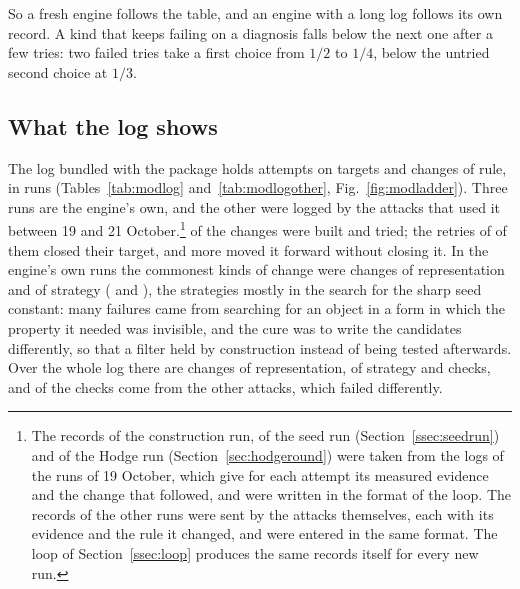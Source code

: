 So a fresh engine follows the table, and an engine with a long log follows its own record. A kind that keeps failing on a diagnosis falls below the next one after a few tries: two failed tries take a first choice from $1/2$ to $1/4$, below the untried second choice at $1/3$.

\subsection{What the log shows}\label{ssec:modlogread}

The log bundled with the package holds \modAttempts{} attempts on \modTargets{} targets and \modChanges{} changes of rule, in \modRuns{} runs (Tables~\ref{tab:modlog} and~\ref{tab:modlogother}, Fig.~\ref{fig:modladder}). Three runs are the engine's own, and the other \modOtherRuns{} were logged by the attacks that used it between 19 and 21 October.\footnote{The records of the construction run, of the seed run (Section~\ref{ssec:seedrun}) and of the Hodge run (Section~\ref{sec:hodgeround}) were taken from the logs of the runs of 19 October, which give for each attempt its measured evidence and the change that followed, and were written in the format of the loop. The records of the other runs were sent by the attacks themselves, each with its evidence and the rule it changed, and were entered in the same format. The loop of Section~\ref{ssec:loop} produces the same records itself for every new run.} \modBuilt{} of the changes were built and tried; the retries of \modRetryClosed{} of them closed their target, and \modRetryPartial{} more moved it forward without closing it. In the engine's own runs the commonest kinds of change were changes of representation and of strategy (\modOwnKindRepresentation{} and \modOwnKindStrategy{}), the strategies mostly in the search for the sharp seed constant: many failures came from searching for an object in a form in which the property it needed was invisible, and the cure was to write the candidates differently, so that a filter held by construction instead of being tested afterwards. Over the whole log there are \modKindRepresentation{} changes of representation, \modKindStrategy{} of strategy and \modKindCheck{} checks, and \modOtherKindCheck{} of the checks come from the other attacks, which failed differently.



